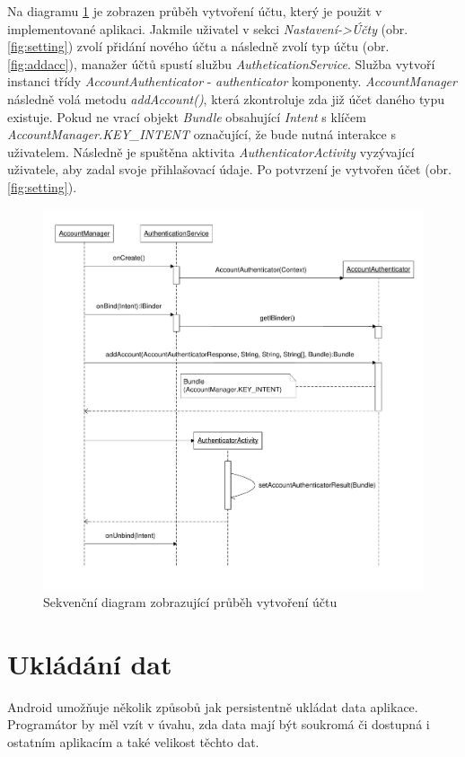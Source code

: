 \documentclass{diplomka}
\begin{document}
Na diagramu \ref{fig:andauth} je zobrazen průběh vytvoření účtu, který je použit v implementované aplikaci. Jakmile uživatel v sekci \emph{Nastavení->Účty} (obr. \ref{fig:setting}) zvolí přidání nového účtu a následně zvolí typ účtu (obr. \ref{fig:addacc}), manažer účtů spustí službu \emph{AutheticationService}. Služba vytvoří instanci třídy \emph{AccountAuthenticator} - \emph{authenticator} komponenty. \emph{AccountManager} následně volá metodu \emph{addAccount()}, která zkontroluje zda již účet daného typu existuje. Pokud ne vrací objekt \emph{Bundle} obsahující \emph{Intent} s klíčem \emph{AccountManager.KEY\_INTENT} označující, že bude nutná interakce s uživatelem. Následně je spuštěna aktivita \emph{AuthenticatorActivity} vyzývající uživatele, aby zadal svoje přihlašovací údaje. Po potvrzení je vytvořen účet (obr. \ref{fig:setting}).
\begin{figure}[H]
  \centering
  \includegraphics[scale=0.7]{visio/andauth.pdf}
\caption{Sekvenční diagram zobrazující průběh vytvoření účtu}
\label{fig:andauth}
\end{figure}



\section{Ukládání dat}
Android umožňuje několik způsobů jak persistentně ukládat data aplikace. Programátor by měl vzít v úvahu, zda data mají být soukromá či dostupná i ostatním aplikacím a také velikost těchto dat. 
\end{document}

